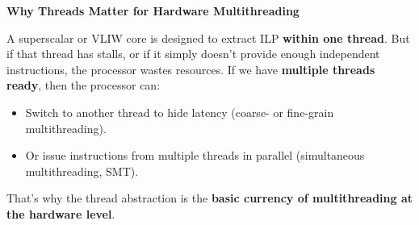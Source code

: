 \highspace
\begin{flushleft}
    \textcolor{Green3}{ \textbf{Why Threads Matter for Hardware Multithreading}}
\end{flushleft}
A superscalar or VLIW core is designed to extract ILP \textbf{within one thread}. But if that thread has stalls, or if it simply doesn't provide enough independent instructions, the processor wastes resources. If we have \textbf{multiple threads ready}, then the processor can:
\begin{itemize}
    \item Switch to another thread to hide latency (coarse- or fine-grain multithreading).
    \item Or issue instructions from multiple threads in parallel (simultaneous multithreading, SMT).
\end{itemize}
That's why the thread abstraction is the \textbf{basic currency of multithreading at the hardware level}.